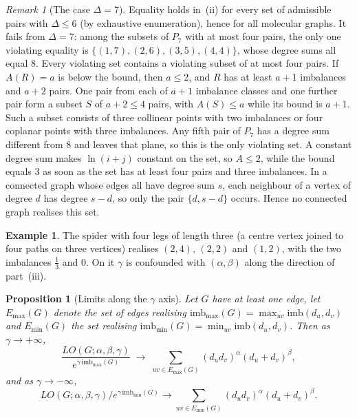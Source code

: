 \documentclass[a5paper, 10pt]{article}
\theoremstyle{plain}
\newtheorem{proposition}[theorem]{Proposition}
\theoremstyle{remark}
\newtheorem*{remark}{Remark}
\theoremstyle{definition}
\newtheorem{example}{Example}
\newcommand{\Wuzi}{LO(G;\alpha,\beta,\gamma)}
\begin{document}
  \begin{remark}[The case $\Delta = 7$]\label{rem:delta7}
  Equality holds in~(ii) for every set of admissible pairs with
  $\Delta \le 6$ (by exhaustive enumeration), hence for all molecular
  graphs. It fails from $\Delta = 7$: among the subsets of $P_7$ with
  at most four pairs, the only one violating equality is
  $\{(1,7),(2,6),(3,5),(4,4)\}$, whose degree sums all equal $8$.
  Every violating set contains a violating subset of at most four pairs. If $A(R) = a$ is below the bound, then $a \le 2$, and $R$ has at least $a+1$ imbalances and $a+2$ pairs. One pair from each of $a+1$ imbalance classes and one further pair form a subset $S$ of $a+2 \le 4$ pairs, with $A(S) \le a$ while its bound is $a+1$. Such a subset consists of three collinear points with two imbalances or four coplanar points with three imbalances. Any fifth pair of $P_7$ has a
  degree sum different from $8$ and leaves that plane, so this is the
  only violating set. A constant degree sum makes $\ln(i+j)$ constant
  on the set, so $A \le 2$, while the bound equals $3$ as soon as the
  set has at least four pairs and three imbalances. In a connected
  graph whose edges all have degree sum $s$, each neighbour of a
  vertex of degree $d$ has degree $s - d$, so only the pair
  $\{d, s-d\}$ occurs. Hence no connected graph realises this set.
  \end{remark}

  \begin{example}\label{ex:spider}
  The spider with four legs of length three (a centre vertex joined to
  four paths on three vertices) realises $(2,4)$, $(2,2)$ and $(1,2)$,
  with the two imbalances $\tfrac13$ and $0$. On it $\gamma$ is
  confounded with $(\alpha,\beta)$ along the direction of part~(iii).
  \end{example}

  \begin{proposition}[Limits along the $\gamma$ axis]\label{prop:gamma_eq_0_or_inf}
  Let $G$ have at least one edge, let $E_{\max}(G)$ denote the set of edges realising
  $\mathrm{imb}_{\max}(G) = \max_{uv} \mathrm{imb}(d_u, d_v)$
  and $E_{\min}(G)$ the set realising
  $\mathrm{imb}_{\min}(G) = \min_{uv} \mathrm{imb}(d_u, d_v)$.
  Then as $\gamma \to +\infty$,
  \[
  \frac{\Wuzi}{e^{\gamma\, \mathrm{imb}_{\max}(G)}}
  \;\longrightarrow\;
  \sum_{uv \in E_{\max}(G)} (d_u d_v)^{\alpha}(d_u + d_v)^{\beta},
  \]
  and as $\gamma \to -\infty$,
  \[
  \Wuzi / e^{\gamma\, \mathrm{imb}_{\min}(G)} \longrightarrow
  \sum_{uv \in E_{\min}(G)} (d_u d_v)^{\alpha}(d_u + d_v)^{\beta}.
  \]
  \end{proposition}
\end{document}
